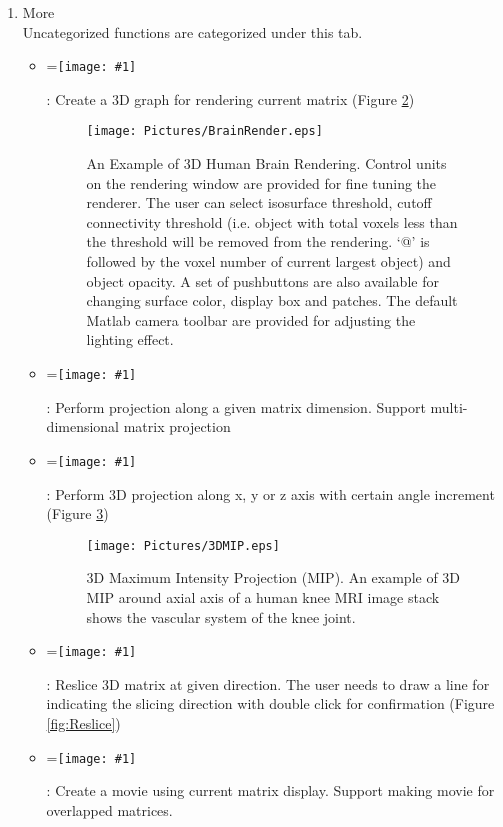 \documentclass{article}%
\newcommand{\vcenteredinclude}[1]{
\begingroup
\setbox0=\hbox{\texttt{[image: \#1]}}
\parbox{\wd0}{\box0}\endgroup}
\begin{document}
\begin{enumerate}
\begin{figure}[htbp]
	\centering
		\texttt{[image: Pictures/matlabIM.eps]}
	\caption{Matlab Tools}
	\label{fig:matlabIM}
\end{figure}	
	
	\item More \\

	Uncategorized functions are categorized under this tab.
	
	\begin{itemize}
		\item \vcenteredinclude{Pictures/3DRender.eps} : Create a 3D graph for rendering current matrix (Figure \ref{fig:BrainRender})
		
		\begin{figure}[htbp]
			\centering
			\texttt{[image: Pictures/BrainRender.eps]}
			\caption{An Example of 3D Human Brain Rendering. Control units on the rendering window are provided for fine tuning the renderer. The user can select isosurface threshold, cutoff connectivity threshold (i.e. object with total voxels less than the threshold will be removed from the rendering. `@' is followed by the voxel number of current largest object) and object opacity. A set of pushbuttons are also available for changing surface color, display box and patches. The default Matlab camera toolbar are provided for adjusting the lighting effect.}
			\label{fig:BrainRender}
		\end{figure}	
		
		\item \vcenteredinclude{Pictures/MIP.eps} : Perform projection along a given matrix dimension. Support multi-dimensional matrix projection
		\item \vcenteredinclude{Pictures/MIP3D.eps} : Perform 3D projection along x, y or z axis with certain angle increment (Figure \ref{fig:3DMIP})
		
		
		\begin{figure}[htbp]
			\centering
				\texttt{[image: Pictures/3DMIP.eps]}
			\caption{3D Maximum Intensity Projection (MIP). An example of 3D MIP around axial axis of a human knee MRI image stack shows the vascular system of the knee joint.}
			\label{fig:3DMIP}
		\end{figure}	
		
		\item \vcenteredinclude{Pictures/3DReslice.eps} : Reslice 3D matrix at given direction. The user needs to draw a line for indicating the slicing direction with double click for confirmation (Figure \ref{fig:Reslice})
		\item \vcenteredinclude{Pictures/Moive.eps} : Create a movie using current matrix display. Support making movie for overlapped matrices.
	\end{itemize}
	

\end{enumerate}
\end{document}
